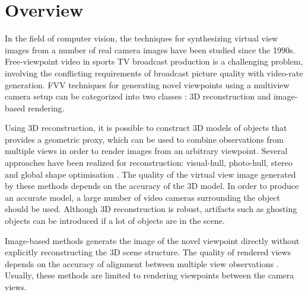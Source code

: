 
\section{Overview}
In the field of computer vision, the techniques for synthesizing virtual view images from a number of real camera
images have been studied since the 1990s.
Free-viewpoint video in sports TV broadcast production is a challenging problem, involving the conflicting requirements of 
broadcast picture quality with video-rate generation.
FVV techniques for generating novel viewpoints using a multiview camera setup can be categorized into two classes 
\cite{05_plane_sweeping}: 3D reconstruction and image-based rendering. 

Using 3D reconstruction, it is possible to construct 3D models of objects that provides a geometric proxy, which can be
used to combine observations from multiple views in order to render images from an arbitrary viewpoint. 
Several approaches have been realized for reconstruction: visual-hull, photo-hull, stereo and 
global shape optimisation \cite{02_iview}.
The quality of the virtual view image generated
by these methods depends on the accuracy of the 3D model. In order to produce an accurate model, a
large number of video cameras surrounding the object should be used. 
Although 3D reconstruction is robust, artifacts such as ghosting objects can be introduced if a lot of objects are in the scene. 

Image-based methods generate the image of the novel viewpoint directly without explicitly reconstructing the 3D scene structure.
The quality of rendered views depends on the accuracy of alignment between multiple view observations 
\cite{05_plane_sweeping,02_iview}.
Usually, these methods are limited to rendering viewpoints between the camera views.




